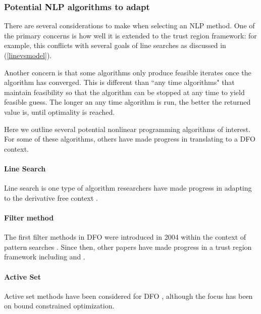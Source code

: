 \documentclass{article}
\let\oldref\ref
\renewcommand{\ref}[1]{(\oldref{#1})}
\begin{document}

\subsubsection{Potential NLP algorithms to adapt}

There are several considerations to make when selecting an NLP method.
One of the primary concerns is how well it is extended to the trust region framework: 
for example, this conflicts with several goals of line searches as discussed in \ref{linevsmodel}.

Another concern is that some algorithms only produce feasible iterates once the algorithm has converged.
This is different than ``any time algorithms" that maintain feasibility so that the algorithm can be stopped at any time to yield feasible guess.
The longer an any time algorithm is run, the better the returned value is, until optimality is reached.

Here we outline several potential nonlinear programming algorithms of interest.
For some of these algorithms, others have made progress in translating to a DFO context.

\paragraph{Line Search}
Line search is one type of algorithm researchers have made progress in adapting to the derivative free context \cite{DUMMY:FasanoLLR14}.
\paragraph{Filter method}
The first filter methods in DFO were introduced in 2004 within the context of pattern searches \cite{DUMMY:filterpattern}.
Since then, other papers have made progress in a trust region framework including \cite{DUMMY:Biegler} and \cite{DUMMY:Brekelman}.
\paragraph{Active Set}
Active set methods have been considered for DFO \cite{DUMMY:activeset1}, although the focus has been on bound constrained optimization.
\end{document}
